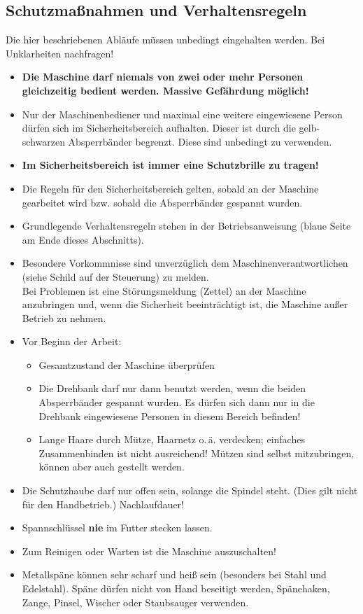\documentclass{\basedir/fablab-document}
\begin{document}
\subsection{Schutzmaßnahmen und Verhaltensregeln}
Die hier beschriebenen Abläufe müssen unbedingt eingehalten werden.
Bei Unklarheiten nachfragen!
\begin{itemize}
\item \textbf{Die Maschine darf niemals von zwei oder mehr Personen gleichzeitig bedient werden. Massive Gefährdung möglich!}
\item Nur der Maschinenbediener und maximal eine weitere eingewiesene Person dürfen sich im Sicherheitsbereich aufhalten. Dieser ist durch die gelb-schwarzen Absperrbänder begrenzt. Diese sind unbedingt zu verwenden.\\
\item \textbf{Im Sicherheitsbereich ist immer eine Schutzbrille zu tragen!}
\item Die Regeln für den Sicherheitsbereich gelten, sobald an der Maschine gearbeitet wird bzw. sobald die Absperrbänder gespannt wurden.
\item Grundlegende Verhaltensregeln stehen in der Betriebsanweisung (blaue Seite am Ende dieses Abschnitts).
\item Besondere Vorkommnisse sind unverzüglich dem Maschinenverantwortlichen (siehe Schild auf der Steuerung) zu melden.\\
Bei Problemen ist eine Störungsmeldung (Zettel) an der Maschine anzubringen und, wenn die Sicherheit beeinträchtigt ist, die Maschine außer Betrieb zu nehmen.

\item Vor Beginn der Arbeit:
\begin{itemize}
\item Gesamtzustand der Maschine überprüfen
\item Die Drehbank darf nur dann benutzt werden, wenn die beiden Absperrbänder gespannt wurden. Es dürfen sich dann nur in die Drehbank eingewiesene Personen in diesem Bereich befinden!
\item Lange Haare durch Mütze, Haarnetz o.\,ä. verdecken; einfaches Zusammenbinden ist nicht ausreichend! Mützen sind selbst mitzubringen, können aber auch gestellt werden.
\end{itemize}

 \item Die Schutzhaube darf nur offen sein, solange die Spindel steht. (Dies gilt nicht für den Handbetrieb.) Nachlaufdauer!  %
 \item Spannschlüssel \textbf{nie} im Futter stecken lassen. %
 \item Zum Reinigen oder Warten ist die Maschine auszuschalten!
 \item Metallspäne können sehr scharf und heiß sein (besonders bei Stahl und Edelstahl). Späne dürfen nicht von Hand beseitigt werden, Spänehaken, Zange, Pinsel, Wischer oder Staubsauger verwenden. %


\end{itemize}
\end{document}
